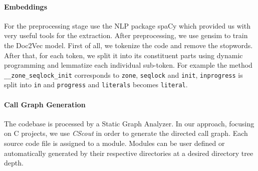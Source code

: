 \documentclass[sigconf,review, anonymous]{acmart}
\begin{document}
\paragraph{Embeddings} 

For the preprocessing stage use the NLP package spaCy \cite{spacy} which provided us with very useful tools for the extraction. After preprocessing, we use gensim \cite{gensim} to train the Doc2Vec model. First of all, we tokenize the code and remove the stopwords. After that, for each token, we split it into its constituent parts using dynamic programming and lemmatize 
each individual sub-token. 
For example the method \texttt{\_\_zone\_seqlock\_init} corresponds to \texttt{zone}, \texttt{seqlock} and \texttt{init}, \texttt{inprogress} is split into \texttt{in} and \texttt{progress} and \texttt{literals} becomes \texttt{literal}.





\paragraph{Call Graph Generation} The codebase is processed by a Static Graph Analyzer. In our approach, focusing on C projects, we use \emph{CScout} \cite{cscout} in order to generate the directed call graph. Each source code file is assigned to a module. Modules can be user defined or automatically generated by their respective directories at a desired directory tree depth. 
\end{document}
